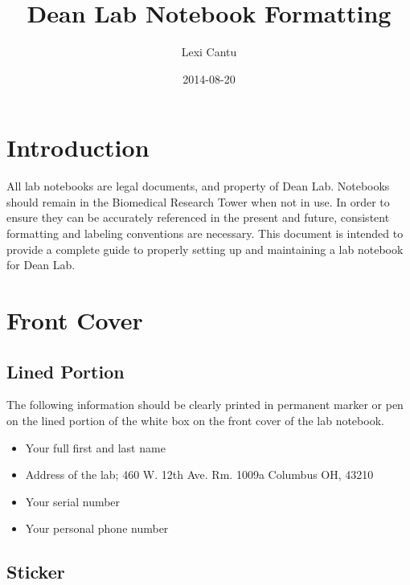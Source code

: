 \documentclass[11pt, oneside]{article}   	%
\title{Dean Lab Notebook Formatting}
\author{Lexi Cantu}
\date{2014-08-20}					%
\begin{document}
\maketitle 							%

\tableofcontents{}					%


\section*{Introduction}	
All lab notebooks are legal documents, and property of Dean Lab. Notebooks should remain in the Biomedical Research Tower when not in use. In order to ensure they can be accurately referenced in the present and future, consistent formatting and labeling conventions are necessary. This document is intended to provide a complete guide to properly setting up and maintaining a lab notebook for Dean Lab.



\section{Front Cover}					%


\normalsize									%
\subsection[Lined Portion]{Lined Portion}

The following information should be clearly printed in permanent marker or pen on the lined portion of the white box on the front cover of the lab notebook.
\begin{itemize}
	\item Your full first and last name
	\item Address of the lab; 460 W. 12th Ave. Rm. 1009a Columbus OH, 43210
	\item Your serial number 
	\item Your personal phone number
\end{itemize}


\subsection[Sticker]{Sticker}	
\end{document}
